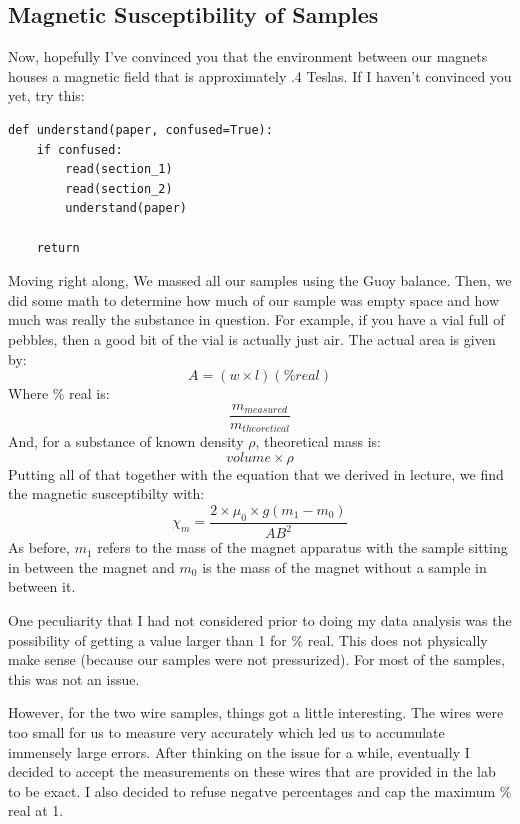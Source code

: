 \documentclass{article}
\begin{document}
\subsection{Magnetic Susceptibility of Samples}
Now, hopefully I've convinced you that the environment between our magnets
houses a magnetic field that is approximately .4 Teslas. If I haven't
convinced you yet, try this:

\begin{center}
\begin{minipage}[t]{.75\textwidth}
\begin{lstlisting}[frame=tlrb]
def understand(paper, confused=True):
    if confused:
        read(section_1)
        read(section_2)
        understand(paper)

    return 
\end{lstlisting}
\end{minipage}
\end{center}

Moving right along, We massed all our samples using the Guoy balance. Then, we
did some math to determine how much of our sample was empty space and how much
was really the substance in question. For example, if you have a vial full of pebbles, then
a good bit of the vial is actually just air. The actual area is given by:
$$A = (w\times l)(\% real)$$
Where \% real is: 
$$\frac{ m_{measured}}{ m_{theoretical}}$$
And, for a substance of known density $\rho$, theoretical mass is:
$$volume \times \rho$$
Putting all of that together with the equation that we derived in lecture, we
find the magnetic susceptibilty with:
$$\chi_m = \frac{2 \times \mu_0 \times g (m_1 - m_0)}{A B^2}$$
As before, $m_1$ refers to the mass of the magnet apparatus with the sample
sitting in between the magnet and $m_0$ is the mass of the magnet without a
sample in between it. 

One peculiarity that I had not considered prior to doing my data analysis was
the possibility of getting a value larger than 1 for \% real. This does not
physically make sense (because our samples were not pressurized). For most of the
samples, this was not an issue. 

However, for the two wire samples, things got a little
interesting. The wires were too small for us to measure very accurately which
led us to accumulate immensely large errors.  After thinking on the issue for a
while, eventually I decided to accept the measurements on these wires that are
provided in the lab to be exact. I also decided to refuse negatve percentages
and cap the maximum \% real at 1. 
\end{document}
